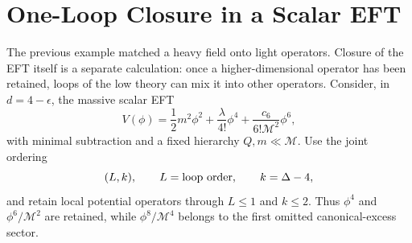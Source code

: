 \section{One-Loop Closure in a Scalar EFT}
\label{sec:scalar-eft-one-loop-closure}

The previous example matched a heavy field onto light operators.  Closure of
the EFT itself is a separate calculation: once a higher-dimensional operator
has been retained, loops of the low theory can mix it into other operators.
Consider, in \(d=4-\epsilon\), the massive scalar EFT
\begin{equation}
  V(\phi)
  =
  \frac12m^2\phi^2
  +
  \frac{\lambda}{4!}\phi^4
  +
  \frac{c_6}{6!\mathcal M^2}\phi^6,
  \label{eq:scalar-eft-phi-four-six-potential}
\end{equation}
with minimal subtraction and a fixed hierarchy \(Q,m\ll\mathcal M\).  Use the
joint ordering
\[
  (L,k),\qquad
  L=\hbox{loop order},\qquad
  k=\Delta-4,
\]
and retain local potential operators through \(L\leq1\) and \(k\leq2\).
Thus \(\phi^4\) and \(\phi^6/\mathcal M^2\) are retained, while
\(\phi^8/\mathcal M^4\) belongs to the first omitted canonical-excess sector.

